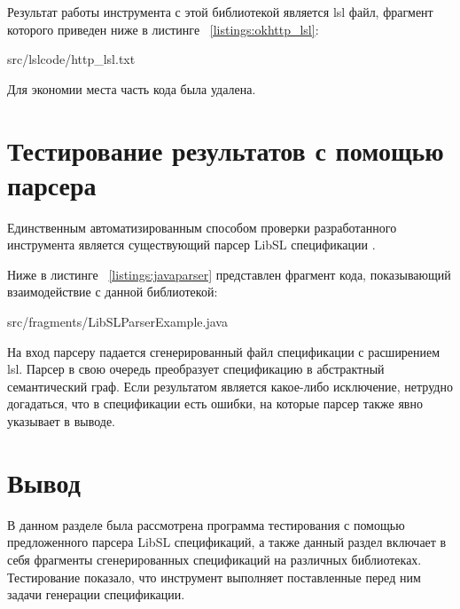 Результат работы инструмента с этой библиотекой является lsl файл, фрагмент которого приведен ниже в листинге ~\ref{listings:okhttp_lsl}:

{src/lslcode/http_lsl.txt}

Для экономии места часть кода была удалена.

\section{Тестирование результатов с помощью парсера}

Единственным автоматизированным способом проверки разработанного инструмента является существующий парсер LibSL спецификации \cite{libsl_parser}.

Ниже в листинге ~\ref{listings:javaparser} представлен фрагмент кода, показывающий взаимодействие с данной библиотекой:

{src/fragments/LibSLParserExample.java}

На вход парсеру падается сгенерированный файл спецификации с расширением lsl. Парсер в свою очередь преобразует спецификацию в абстрактный семантический граф.
Если результатом является какое-либо исключение, нетрудно догадаться, что в спецификации есть ошибки, на которые парсер также явно указывает в выводе.

\section{Вывод}

В данном разделе была рассмотрена программа тестирования с помощью предложенного парсера LibSL спецификаций, а также данный раздел включает в себя фрагменты сгенерированных спецификаций на различных библиотеках.
Тестирование показало, что инструмент выполняет поставленные перед ним задачи генерации спецификации.

